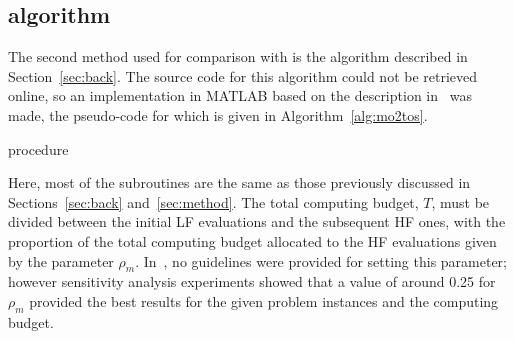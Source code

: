 \subsection{\motos{} algorithm}

The second method used for comparison with \AlgName{} is the \motos{} algorithm described in Section~\ref{sec:back}. The source code for this algorithm could not be retrieved online, so an implementation in MATLAB based on the description in~\cite{xu2016mo2tos} was made, the pseudo-code for which is given in Algorithm~\ref{alg:mo2tos}.
\begin{algorithm}[h!] 
\caption{\motos{} procedure}
\label{alg:mo2tos}
{\footnotesize
\begin{algorithmic}[1]
 
 
 
 
 
 
   
   
   
   
   
\ENDWHILE
{} 
\end{algorithmic}
}
\end{algorithm}

Here, most of the subroutines are the same as those previously discussed in Sections~\ref{sec:back} and~\ref{sec:method}. The total computing budget, $T$, must be divided between the initial LF evaluations and the subsequent HF ones, with the proportion of the total computing budget allocated to the HF evaluations given by the parameter $\rho_m$. In~\cite{xu2016mo2tos}, no guidelines were provided for setting this parameter; however sensitivity analysis experiments showed that a value of around 0.25 for $\rho_m$ provided the best results for the given problem instances and the computing budget. 

